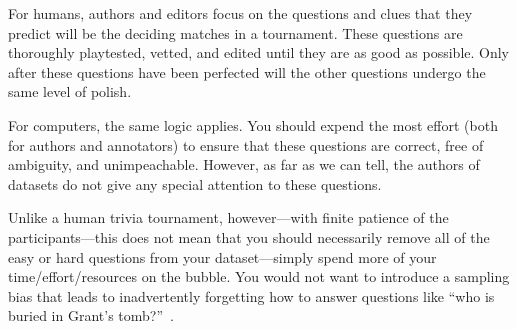 For humans, authors and editors focus on the questions and clues that they predict will be the deciding matches in a tournament.
These questions are thoroughly playtested, vetted, and edited until they are as good as possible.
Only after these questions have been perfected will the other questions undergo the same level of polish.

For computers, the same logic applies.  
You should expend the most effort (both for authors and annotators) to ensure that these questions are correct, free of ambiguity, and unimpeachable.
However, as far as we can tell, the authors of \qa{} datasets do not give any special attention to these questions.

Unlike a human trivia tournament, however---with finite patience of the participants---this does not mean that you should necessarily remove all of the easy or hard questions from your dataset---simply spend more of your time/effort/resources on the bubble.
You would not want to introduce a sampling bias that leads to inadvertently forgetting how to answer questions like ``who is buried in Grant's tomb?''~\cite[Chapter 7]{dwan-00}.